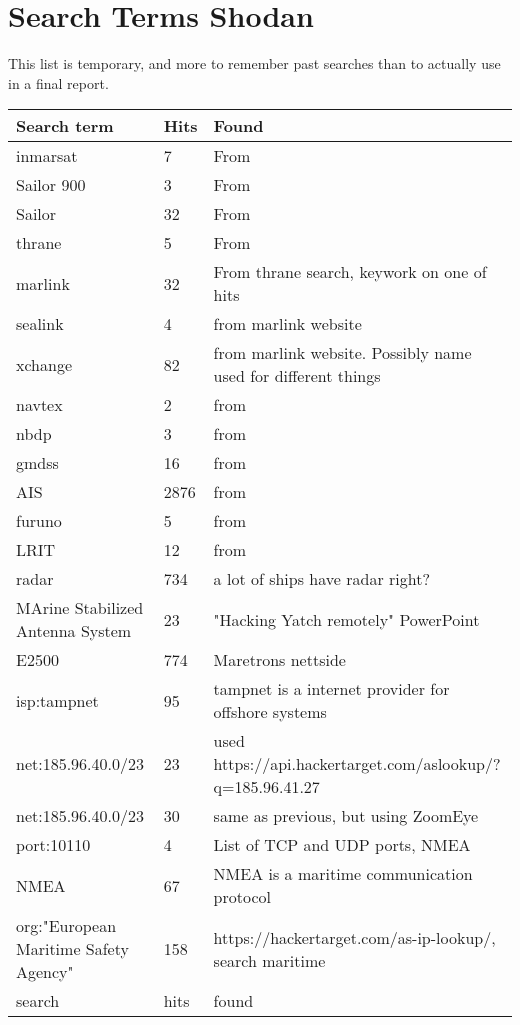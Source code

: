 

\section{Search Terms Shodan} \label{sec:search_term}
This list is temporary, and more to remember past searches than to actually use in a final report.
\begin{table}[H]
\centering
\begin{tabular}{|l|l|l|}
\hline
Search term & Hits & Found \\ \hline
inmarsat & 7 & From \cite{maritime_pen_test} \\ \hline
Sailor 900 & 3 & From \cite{maritime_pen_test} \\ \hline
Sailor & 32 & From \cite{maritime_pen_test} \\ \hline
thrane & 5 & From \cite{maritime_pen_test} \\ \hline
marlink & 32 &  From thrane search, keywork on one of hits \\ \hline
sealink & 4 &  from marlink website\\ \hline
xchange & 82 &  from marlink website. Possibly name used for different things\\ \hline
navtex & 2 &  from \cite{maritime_digitalization}\\ \hline
nbdp & 3 &  from \cite{maritime_digitalization}\\ \hline
gmdss & 16 &  from \cite{maritime_digitalization}\\ \hline
AIS & 2876 &  from \cite{maritime_digitalization}\\ \hline
furuno & 5 &  from \cite{maritime_digitalization}\\ \hline
LRIT & 12 &  from \cite{maritime_digitalization}\\ \hline
radar & 734 &  a lot of ships have radar right?\\ \hline
MArine Stabilized Antenna System & 23 &  "Hacking Yatch remotely" PowerPoint\\ \hline
E2500 & 774 &  Maretrons nettside\\ \hline
isp:tampnet & 95 &  tampnet is a internet provider for offshore systems\\ \hline
net:185.96.40.0/23 & 23 &  used https://api.hackertarget.com/aslookup/?q=185.96.41.27\\ \hline
net:185.96.40.0/23 & 30 &  same as previous, but using ZoomEye\\ \hline
port:10110 & 4 &  List of TCP and UDP ports, NMEA\\ \hline
NMEA & 67 &  NMEA is a maritime communication protocol\\ \hline

org:"European Maritime Safety Agency" & 158 &  https://hackertarget.com/as-ip-lookup/, search maritime\\ \hline
search & hits &  found\\ \hline
\end{tabular}
\end{table}


